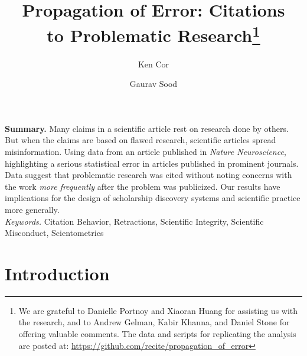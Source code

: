 \documentclass[12pt, letterpaper]{article}
\begin{document}
\title{\Large{Propagation of Error: Citations\\ to Problematic Research}\footnote{We are grateful to Danielle Portnoy and Xiaoran Huang for assisting us with the research, and to Andrew Gelman, Kabir Khanna, and Daniel Stone for offering valuable comments. The data and scripts for replicating the analysis are posted at: \href{https://github.com/recite/propagation_of_error}{https://github.com/recite/propagation\_of\_error}}\\\vspace{5mm}}

\author{Ken Cor\\
\and Gaurav Sood}
\maketitle

\vspace{.2cm}
\doublespacing
\clearpage
\textbf{Summary.} Many claims in a scientific article rest on research done by others. But when the claims are based on flawed research, scientific articles spread misinformation. Using data from an article published in \textit{Nature Neuroscience}, highlighting a serious statistical error in articles published in prominent journals. Data suggest that problematic research was cited without noting concerns with the work \textit{more frequently} after the problem was publicized. Our results have implications for the design of scholarship discovery systems and scientific practice more generally.
\vspace{.2cm}\\
\singlespacing
\textit{Keywords.} Citation Behavior, Retractions, Scientific Integrity, Scientific Misconduct, Scientometrics
\doublespacing
\clearpage

\section{Introduction}
\end{document}
